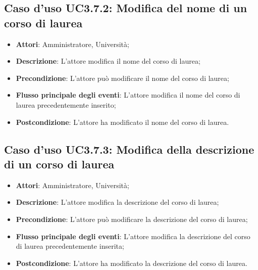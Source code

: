 \subsection{Caso d'uso \texorpdfstring{UC3.7.2}{UC3.7.2}: Modifica del nome di un corso di laurea}
\begin{itemize}
\item \textbf{Attori}: Amministratore, Università;
\item \textbf{Descrizione}: L'attore modifica il nome del corso di laurea;

\item \textbf{Precondizione}: L'attore può modificare il nome del corso di laurea;

\item \textbf{Flusso principale degli eventi}: L'attore modifica il nome del corso di laurea precedentemente inserito;

\item \textbf{Postcondizione}: L'attore ha modificato il nome del corso di laurea.

\end{itemize}
\subsection{Caso d'uso \texorpdfstring{UC3.7.3}{UC3.7.3}: Modifica della descrizione di un corso di laurea}
\begin{itemize}
\item \textbf{Attori}: Amministratore, Università;
\item \textbf{Descrizione}: L'attore modifica la descrizione del corso di laurea;

\item \textbf{Precondizione}: L'attore può modificare la descrizione del corso di laurea;

\item \textbf{Flusso principale degli eventi}: L'attore modifica la descrizione del corso di laurea precedentemente inserita;

\item \textbf{Postcondizione}: L'attore ha modificato la descrizione del corso di laurea.

\end{itemize}
